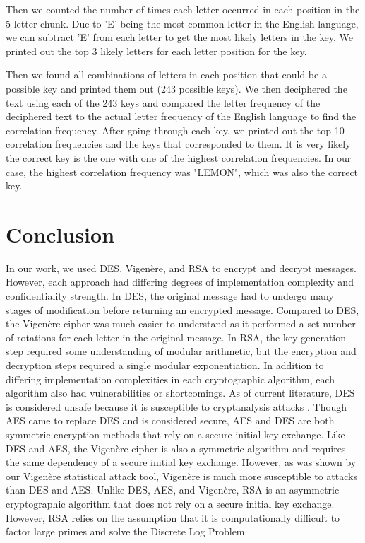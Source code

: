 \documentclass[acmlarge]{acmart}
\begin{document}
Then we counted the number of times each letter occurred in each position in the 5 letter chunk. Due to 'E' being the most common letter in the English language, we can subtract 'E' from each letter to get the most likely letters in the key. We printed out the top 3 likely letters for each letter position for the key.

Then we found all combinations of letters in each position that could be a possible key and printed them out (243 possible keys). We then deciphered the text using each of the 243 keys and compared the letter frequency of the deciphered text to the actual letter frequency of the English language to find the correlation frequency. After going through each key, we printed out the top 10 correlation frequencies and the keys that corresponded to them. It is very likely the correct key is the one with one of the highest correlation frequencies. In our case, the highest correlation frequency was "LEMON", which was also the correct key.

\section{Conclusion}\label{sec:conclusion}

In our work, we used DES, Vigen\`{e}re, and RSA to encrypt and decrypt messages. However, each approach had differing degrees of implementation complexity and confidentiality strength. In DES, the original message had to undergo many stages of modification before returning an encrypted message. Compared to DES, the Vigen\`{e}re cipher was much easier to understand as it performed a set number of rotations for each letter in the original message. In RSA, the key generation step required some understanding of modular arithmetic, but the encryption and decryption steps required a single modular exponentiation. In addition to differing implementation complexities in each cryptographic algorithm, each algorithm also had vulnerabilities or shortcomings. As of current literature, DES is considered unsafe because it is susceptible to cryptanalysis attacks \cite{DESCryptanalysis}. Though AES came to replace DES and is considered secure, AES and DES are both symmetric encryption methods that rely on a secure initial key exchange. Like DES and AES, the Vigen\`{e}re cipher is also a symmetric algorithm and requires the same dependency of a secure initial key exchange. However, as was shown by our Vigen\`{e}re statistical attack tool, Vigen\`{e}re is much more susceptible to attacks than DES and AES. Unlike DES, AES, and Vigen\`{e}re, RSA is an asymmetric cryptographic algorithm that does not rely on a secure initial key exchange. However, RSA relies on the assumption that it is computationally difficult to factor large primes and solve the Discrete Log Problem. 



\end{document}

